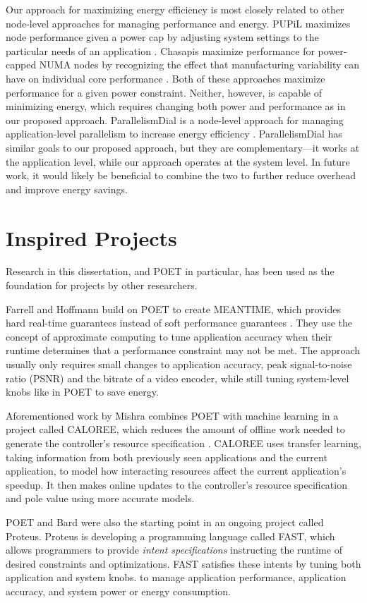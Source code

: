 Our approach for maximizing energy efficiency is most closely related to other node-level approaches for managing performance and energy.
PUPiL maximizes node performance given a power cap by adjusting system settings to the particular needs of an application \cite{pupil}.
Chasapis \etal maximize performance for power-capped NUMA nodes by recognizing the effect that manufacturing variability can have on individual core performance \cite{Chasapis2016}.
Both of these approaches maximize performance for a given power constraint.
Neither, however, is capable of minimizing energy, which requires changing both power and performance as in our proposed approach.
ParallelismDial is a node-level approach for managing application-level parallelism to increase energy efficiency \cite{Sridharan2013}.
ParallelismDial has similar goals to our proposed approach, but they are complementary---it works at the application level, while our approach operates at the system level.
In future work, it would likely be beneficial to combine the two to further reduce overhead and improve energy savings.


\section{Inspired Projects}

Research in this dissertation, and POET in particular, has been used as the foundation for projects by other researchers.

Farrell and Hoffmann build on POET to create MEANTIME, which provides hard real-time guarantees instead of soft performance guarantees \cite{meantime}.
They use the concept of approximate computing to tune application accuracy when their runtime determines that a performance constraint may not be met.
The approach usually only requires small changes to application accuracy, \eg peak signal-to-noise ratio (PSNR) and the bitrate of a video encoder, while still tuning system-level knobs like in POET to save energy.

Aforementioned work by Mishra \etal combines POET with machine learning in a project called CALOREE, which reduces the amount of offline work needed to generate the controller's resource specification \cite{CALOREE}.
CALOREE uses transfer learning, taking information from both previously seen applications and the current application, to model how interacting resources affect the current application's speedup.
It then makes online updates to the controller's resource specification and pole value using more accurate models.

POET and Bard were also the starting point in an ongoing project called Proteus.
Proteus is developing a programming language called FAST, which allows programmers to provide \emph{intent specifications} instructing the runtime of desired constraints and optimizations.
FAST satisfies these intents by tuning both application and system knobs. \eg to manage application performance, application accuracy, and system power or energy consumption.
